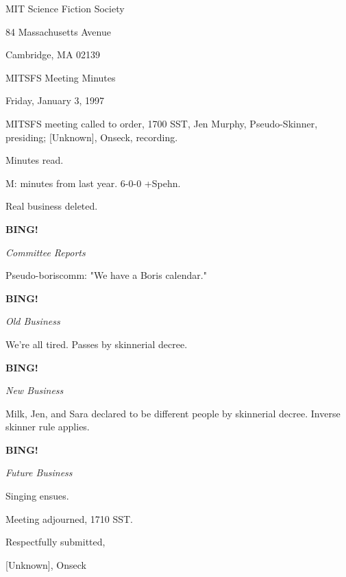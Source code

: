 \documentclass[12pt]{article}
\newcommand{\bing}{{\bf BING!} }
\newcommand{\goto}[1]{\bing \vskip 12pt \centerline{{\em{#1}}}}
\begin{document}
\begin{center}

MIT Science Fiction Society 

84 Massachusetts Avenue

Cambridge, MA 02139

\vspace{12pt}

MITSFS Meeting Minutes 

Friday, January 3, 1997

\end{center}
 
\vspace{18pt}

\setlength{\parskip}{6pt}

\noindent
MITSFS meeting called to order, 1700 SST,
Jen Murphy, Pseudo-Skinner, presiding; [Unknown], Onseck, recording.

Minutes read.

M: minutes from last year. 6-0-0 +Spehn.

Real business deleted.

\goto{Committee Reports}

Pseudo-boriscomm: "We have a Boris calendar."

\goto{Old Business}

We're all tired. Passes by skinnerial decree.

\goto{New Business}

Milk, Jen, and Sara declared to be different people by skinnerial decree. Inverse skinner rule applies.

\goto{Future Business}

Singing ensues.

\vspace{12pt}

\noindent
Meeting adjourned, 1710 SST.

\vspace{18pt}

\centerline{Respectfully submitted,}
\centerline{[Unknown], Onseck}
\end{document}
